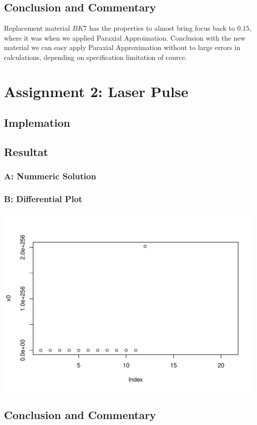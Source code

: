 \documentclass[12pt]{article}
\begin{document}
\subsection{Conclusion and Commentary}
Replacement material $BK7$ has the properties to almost bring focus back to $0.15$, where it was when we applied Paraxial Approimation. 
Conclusion with the new material we can easy apply Paraxial Approximation
without to large errors in calculations, depending on specification limitation of cource. 

\section{Assignment 2: Laser Pulse}

\subsection{Implemation}

\subsection{Resultat}
\subsubsection{A: Nummeric Solution}

\subsubsection{B: Differential Plot}
\includegraphics[scale=0.6]{N.pdf}

\subsection{Conclusion and Commentary}
\end{document}

